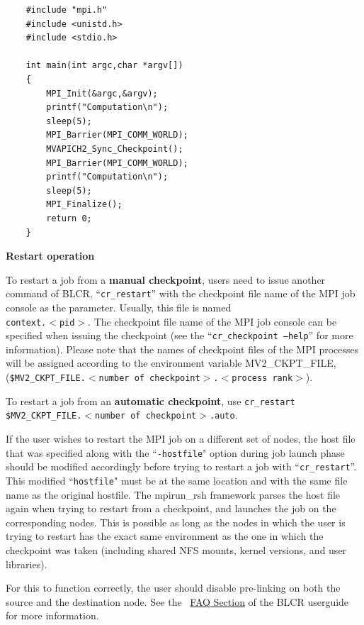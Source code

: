 \begin{itemize}
    \begin{verbatim}
    #include "mpi.h"
    #include <unistd.h>
    #include <stdio.h>

    int main(int argc,char *argv[])
    {
        MPI_Init(&argc,&argv);
        printf("Computation\n");
        sleep(5);
        MPI_Barrier(MPI_COMM_WORLD);
        MVAPICH2_Sync_Checkpoint();
        MPI_Barrier(MPI_COMM_WORLD);
        printf("Computation\n");
        sleep(5);
        MPI_Finalize();
        return 0;
    }
    \end{verbatim}

\end{itemize}

\noindent\textbf{Restart operation}

To restart a job from a \textbf{manual checkpoint}, users need to issue another
command of BLCR, ``\texttt{cr\_restart}'' with the checkpoint file name of the
MPI job console as the parameter. Usually, this file is named
\\\texttt{context.$<$pid$>$}. The checkpoint file name of the MPI job console
can be specified when issuing the checkpoint (see the ``\texttt{cr\_checkpoint
--help}'' for more information). Please note that the names of checkpoint files
of the MPI processes will be assigned according to the environment variable
{MV2\_CKPT\_FILE}, \\(\texttt{\${MV2\_CKPT\_FILE.$<$number of
checkpoint$>$.$<$process rank$>$}}).

To restart a job from an \textbf{automatic checkpoint}, use \texttt{cr\_restart
\$MV2\_CKPT\_FILE.$<$number of checkpoint$>$.auto}.

If the user wishes to restart the MPI job on a different set of nodes, the host
file that was specified along with the ``\texttt{-hostfile}" option during job
launch phase should be modified accordingly before trying to restart a job with
``\texttt{cr\_restart}''. This modified ``\texttt{hostfile}" must be at the same
location and with the same file name as the original hostfile.  The mpirun\_rsh
framework parses the host file again when trying to restart from a checkpoint,
and launches the job on the corresponding nodes. This is possible as long as the
nodes in which the user is trying to restart has the exact same environment as
the one in which the checkpoint was taken (including shared NFS mounts, kernel
versions, and user libraries).

For this to function correctly, the user should disable pre-linking on both the
source and the destination node.  See the
~\href{https://upc-bugs.lbl.gov//blcr/doc/html/FAQ.html#prelink}{FAQ Section} of
the BLCR userguide for more information.

